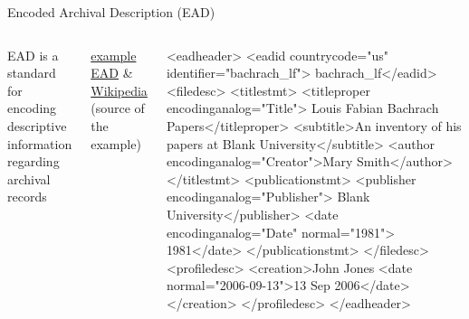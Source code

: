 \begin{frame}[fragile]{Encoded Archival Description (EAD)}
\small
\begin{columns}
\begin{block}{EAD}
is a standard for encoding descriptive information regarding archival records
\end{block}

\href{https://www.loc.gov/ead/tglib/appendix_c.html}{example EAD} \& \href{https://en.wikipedia.org/wiki/Encoded_Archival_Description}{Wikipedia} (source of the example)

\begin{xmlcode}
<eadheader>
   <eadid countrycode="us" identifier="bachrach_lf">
     bachrach_lf</eadid>
   <filedesc>
      <titlestmt>
         <titleproper encodinganalog="Title">
          Louis Fabian Bachrach Papers</titleproper>
         <subtitle>An inventory of his papers at 
           Blank University</subtitle>
         <author encodinganalog="Creator">Mary Smith</author>
      </titlestmt>
      <publicationstmt>
         <publisher encodinganalog="Publisher">
           Blank University</publisher>
         <date encodinganalog="Date" normal="1981">
           1981</date>
      </publicationstmt>
   </filedesc>
   <profiledesc>
      <creation>John Jones
         <date normal="2006-09-13">13 Sep 2006</date>
      </creation>
   </profiledesc>
</eadheader>
\end{xmlcode}
\end{columns}
\end{frame}



